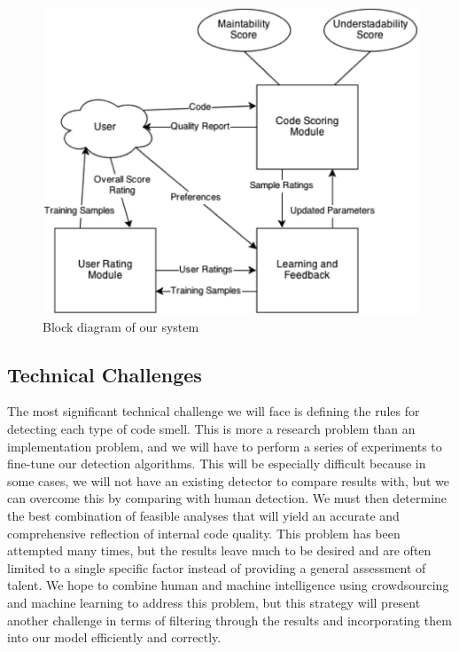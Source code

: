 \documentclass{sig-alternate}
\begin{document}
\begin{figure}[htb!]
	\begin{center}
		\includegraphics[width=0.9\linewidth]{block_diagram}
	\end{center}
	\vspace{-12pt}
	\caption{Block diagram of our system}
	\label{fig:some_graph}
\end{figure}

\subsection{Technical Challenges}
\label{subsec:tech_challenges}

The most significant technical challenge we will face is defining the rules for detecting each type of code smell. This is more a research problem than an implementation problem, and we will have to perform a series of experiments to fine-tune our detection algorithms. This will be especially difficult because in some cases, we will not have an existing detector to compare results with, but we can overcome this by comparing with human detection. We must then determine the best combination of feasible analyses that will yield an accurate and comprehensive reflection of internal code quality. This problem has been attempted many times, but the results leave much to be desired and are often limited to a single specific factor instead of providing a general assessment of talent. We hope to combine human and machine intelligence using crowdsourcing and machine learning to address this problem, but this strategy will present another challenge in terms of filtering through the results and incorporating them into our model efficiently and correctly.
\end{document}
